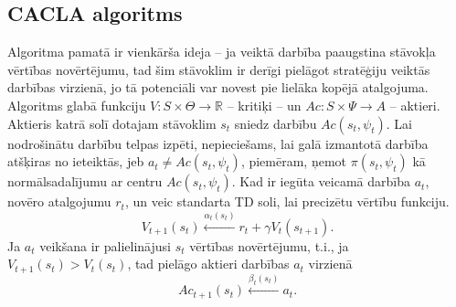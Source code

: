\documentclass[a0,landscape]{a0poster}
\numberwithin{equation}{section}
\theoremstyle{definition}
\theoremstyle{plain}
\begin{document}
\begin{multicols}{4}
\subsection*{CACLA algoritms}
Algoritma pamatā ir vienkārša ideja -- ja veiktā darbība paaugstina stāvokļa vērtības novērtējumu, tad šim stāvoklim ir derīgi pielāgot stratēģiju veiktās darbības virzienā, jo tā potenciāli var novest pie lielāka kopējā atalgojuma.
Algoritms glabā funkciju $V:S \times \Theta \rightarrow \mathbb{R}$ -- kritiķi -- un $Ac : S \times \Psi \rightarrow A$ -- aktieri.
Aktieris katrā solī dotajam stāvoklim $s_t$ sniedz darbību $Ac(s_t, \psi_t)$.
Lai nodrošinātu darbību telpas izpēti, nepieciešams, lai galā izmantotā darbība atšķiras no ieteiktās, jeb $a_t \neq Ac(s_t, \psi_t)$, piemēram, ņemot $\pi(s_t, \psi_t)$ kā normālsadalījumu ar centru $Ac(s_t, \psi_t)$.
Kad ir iegūta veicamā darbība $a_t$, novēro atalgojumu $r_t$, un veic standarta TD soli, lai precizētu vērtību funkciju.
\[
	V_{t+1}(s_t) \xleftarrow{\alpha_t(s_t)} r_t + \gamma V_t(s_{t + 1}).
\]
Ja $a_t$ veikšana ir palielinājusi $s_t$ vērtības novērtējumu, t.i., ja $V_{t+1}(s_t) > V_t(s_t)$, tad pielāgo aktieri darbības $a_t$ virzienā
\[
	Ac_{t+1}(s_t) \xleftarrow{\beta_t(s_t)} a_t.
\]

\end{multicols}
\end{document}
